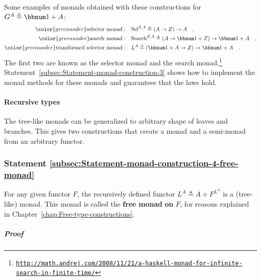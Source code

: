 Some examples of monads obtained with these constructions for $G^{A}\triangleq\bbnum 1+A$:
\begin{align*}
{\color{greenunder}\text{selector monad}:}\quad & \text{Sel}^{Z,A}\triangleq\left(A\rightarrow Z\right)\rightarrow A\quad,\\
{\color{greenunder}\text{search monad}:}\quad & \text{Search}^{Z,A}\triangleq\left(A\rightarrow\bbnum 1+Z\right)\rightarrow\bbnum 1+A\quad,\\
{\color{greenunder}\text{transformed selector monad}:}\quad & L^{A}\triangleq\left(\bbnum 1+A\rightarrow Z\right)\rightarrow\bbnum 1+A\quad.
\end{align*}
The first two are known as the selector monad
and the search monad.\footnote{\texttt{\href{http://math.andrej.com/2008/11/21/a-haskell-monad-for-infinite-search-in-finite-time/}{http://math.andrej.com/2008/11/21/a-haskell-monad-for-infinite-search-in-finite-time/}}}
Statement~\ref{subsec:Statement-monad-construction-3} shows how
to implement the monad methods for these monads and guarantees that
the laws hold.

\paragraph{Recursive types}

The tree-like monads can be generalized to arbitrary shape of leaves
and branches. This gives two constructions that create a monad and
a semi-monad from an arbitrary functor.

\subsubsection{Statement \label{subsec:Statement-monad-construction-4-free-monad}\ref{subsec:Statement-monad-construction-4-free-monad}}

For any given functor $F$, the recursively defined functor $L^{A}\triangleq A+F^{L^{A}}$
is a (tree-like) monad. This monad is called the \textbf{free monad}\textbf{
on} $F$, for reasons explained in Chapter~\ref{chap:Free-type-constructions}.

\subparagraph{Proof}

